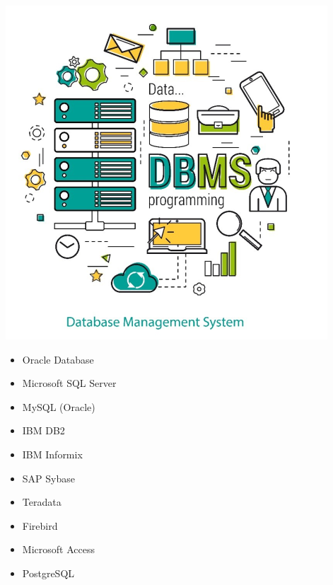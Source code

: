 \documentclass{beamer}
\begin{document}
\begin{frame}
\begin{minipage}{0.4\textwidth}
  \begin{flushleft}
	\begin{center}
		\includegraphics[scale=0.4]{images/DBMS-01.png}
	\end{center}
  \end{flushleft}
\end{minipage}
\begin{minipage}{0.4\textwidth}
  \begin{flushright}
  	\begin{itemize}
		\item Oracle Database
		\item Microsoft SQL Server
		\item MySQL (Oracle)
		\item IBM DB2
		\item IBM Informix
		\item SAP Sybase
		\item Teradata
		\item Firebird
		\item Microsoft Access
		\item PostgreSQL
  	\end{itemize}
  \end{flushright}
\end{minipage}
\end{frame}
\end{document}
